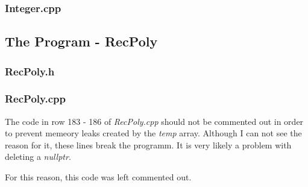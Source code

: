 \documentclass[11pt,titlepage]{article}
\begin{document}
			\subsubsection{Integer.cpp}
				

\newpage		
		\subsection{The Program - RecPoly}
			\subsubsection{RecPoly.h}		
				
			
			\subsubsection{RecPoly.cpp}
			The code in row 183 - 186 of \emph{RecPoly.cpp} should not be commented out in order to prevent memeory leaks created by the \emph{temp} array. Although I can not see the reason for it, these lines break the programm. 
			It is very likely a problem with deleting a \emph{nullptr}.
			
			For this reason, this code was left commented out.
				
			
			
\end{document}
